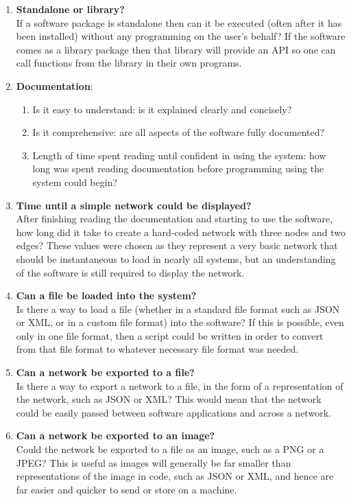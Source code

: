 \documentclass[../dissertation.tex]{subfiles}
\begin{document}
\begin{enumerate}
	\item \textbf{Standalone or library?}\\
	If a software package is standalone then can it be executed (often after it has been installed) without any programming on the user's behalf? If the software comes as a library package then that library will provide an API so one can call functions from the library in their own programs. 
	\item \textbf{Documentation}:
	\begin{enumerate}
		\item Is it easy to understand: is it explained clearly and concisely?
		\item Is it comprehensive: are all aspects of the software fully documented?
		\item Length of time spent reading until confident in using the system: how long was spent reading documentation before programming using the system could begin?
	\end{enumerate}
	\item \textbf{Time until a simple network could be displayed?}\\
	After finishing reading the documentation and starting to use the software, how long did it take to create a hard-coded network with three nodes and two edges? These values were chosen as they represent a very basic network that should be instantaneous to load in nearly all systems, but an understanding of the software is still required to display the network.
	\item \textbf{Can a file be loaded into the system?}\\
	Is there a way to load a file (whether in a standard file format such as JSON or XML, or in a custom file format) into the software? If this is possible, even only in one file format, then a script could be written in order to convert from that file format to whatever necessary file format was needed. 
	\item \textbf{Can a network be exported to a file?}\\
	Is there a way to export a network to a file, in the form of a representation of the network, such as JSON or XML? This would mean that the network could be easily passed between software applications and across a network.
	\item \textbf{Can a network be exported to an image?}\\
	Could the network be exported to a file as an image, such as a PNG or a JPEG? This is useful as images will generally be far smaller than representations of the image in code, such as JSON or XML, and hence are far easier and quicker to send or store on a machine.

\end{enumerate}
\end{document}
